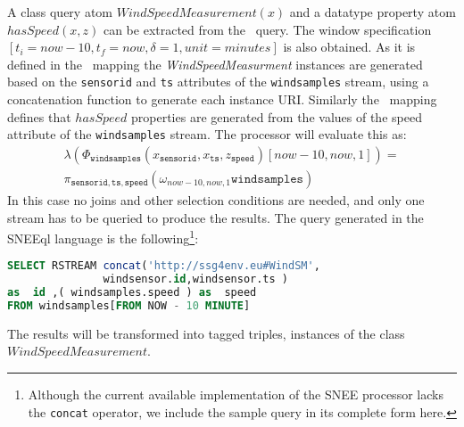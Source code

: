 A class query atom $WindSpeedMeasurement(x)$ and a datatype property atom $hasSpeed(x,z)$ can be extracted from the \sparqlstr\ query. The window specification $[t_i=now-10,t_f=now,\delta=1,unit=minutes]$ is also obtained. As it is defined in the \stwoo\ mapping the \textit{WindSpeedMeasurment} instances are generated based on the \texttt{sensorid} and \texttt{ts} attributes of the \texttt{windsamples} stream, using a concatenation function to generate each instance URI.
Similarly the \stwoo\ mapping defines that $hasSpeed$ properties are generated from the values of the speed attribute of the \texttt{windsamples} stream. The processor will evaluate this as:
\begin{align*}
\lambda(\Phi_{\mathtt{windsamples}}(x_{\mathtt{sensorid}},x_{\mathtt{ts}},z_{\mathtt{speed}})[now-10,now,1]) = \\ \pi_{\mathtt{sensorid,ts,speed}}(\omega_{now-10,now,1} \mathtt{windsamples})
\end{align*}
In this case no joins and other selection conditions are needed, and only one stream has to be queried to produce the results. The query generated in the SNEEql language is the following\footnote {Although the current available implementation of the SNEE processor lacks the \texttt{concat} operator, we include the sample query in its complete form here.}:

\begin{lstlisting}[style=HaskellSNEE,language=SQL,frame=none]
SELECT RSTREAM concat('http://ssg4env.eu#WindSM',
               windsensor.id,windsensor.ts )
as  id ,( windsamples.speed ) as  speed
FROM windsamples[FROM NOW - 10 MINUTE]
\end{lstlisting}
%
The results will be transformed into tagged triples, instances of the class $WindSpeedMeasurement$.



